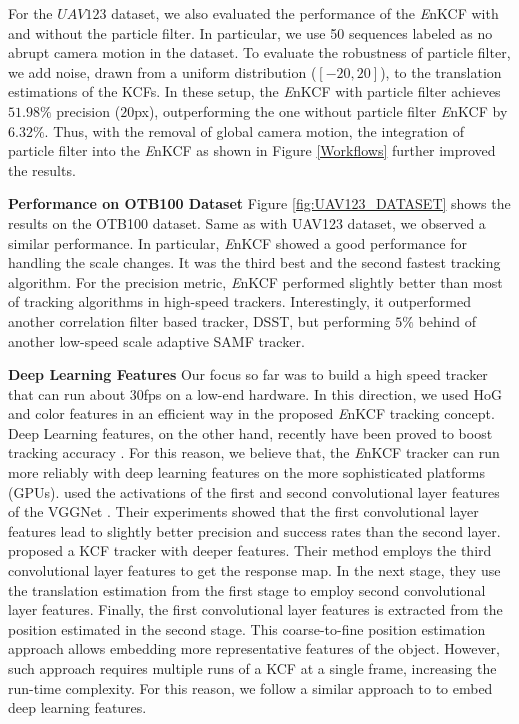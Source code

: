 \documentclass[10pt,twocolumn,letterpaper]{article}
\begin{document}
For the $UAV123$ dataset, we also evaluated the performance of the
{\it E}nKCF with and without the particle filter. In particular, we
use 50 sequences labeled as no abrupt camera motion in the dataset. To
evaluate the robustness of particle filter, we add noise, drawn from a
uniform distribution ($[-20,20]$), to the translation estimations of
the KCFs. In these setup, the {\it E}nKCF with particle filter
achieves $51.98\%$ precision ($20$px), outperforming the one without
particle filter {\it E}nKCF by $6.32\%$. Thus, with the removal of
global camera motion, the integration of particle filter into the {\it
  E}nKCF as shown in Figure \ref{Workflows} further improved the
results.

\textbf{Performance on OTB100 Dataset} Figure \ref{fig:UAV123_DATASET}
shows the results on the OTB100 dataset. Same as with UAV123 dataset,
we observed a similar performance. In particular, {\it E}nKCF showed a
good performance for handling the scale changes. It was the third best
and the second fastest tracking algorithm. For the precision metric,
{\it E}nKCF performed slightly better than most of tracking algorithms
in high-speed trackers. Interestingly, it outperformed another
correlation filter based tracker, DSST, but performing $5\%$ behind of
another low-speed scale adaptive SAMF tracker.

\textbf{Deep Learning Features} Our focus so far was to build a high speed tracker
that can run about 30fps on a low-end hardware. In this direction, we used HoG and
color features in an efficient way in the proposed {\it E}nKCF tracking concept. Deep Learning
features, on the other hand, recently have been proved to boost tracking accuracy \cite{ma2015hierarchical,
danelljan2015convolutional}. For this reason, we believe that, the {\it E}nKCF tracker can run more reliably with deep learning
features on the more sophisticated platforms (GPUs). \cite{danelljan2015convolutional} used the activations of the first
and second convolutional layer features of the VGGNet \cite{simonyan2014very}. Their experiments showed that
the first convolutional layer features lead to slightly better precision and success rates than the second
layer. \cite{ma2015hierarchical} proposed a KCF tracker with deeper features. Their method employs the third convolutional layer
features to get the response map. In the next stage, they use the translation estimation from the first stage to
employ second convolutional layer features. Finally, the first convolutional layer features is extracted from the 
position estimated in the second stage. This coarse-to-fine position estimation approach allows embedding 
more representative features of the object. However, such approach requires multiple runs of a KCF at a single
frame, increasing the run-time complexity. For this reason, we follow a similar approach to \cite{danelljan2015convolutional} to embed
deep learning features. 
\end{document}
